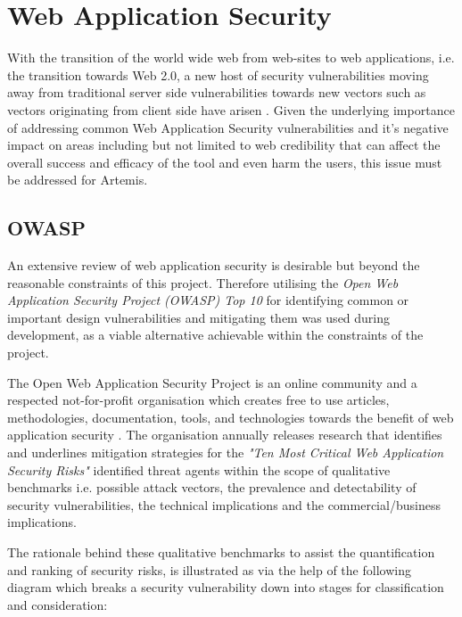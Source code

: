 \section{Web Application Security}

With the transition of the world wide web from web-sites to web applications, i.e. the transition towards Web 2.0, a new host of security vulnerabilities moving away from traditional server side vulnerabilities towards new vectors such as vectors originating from client side have arisen \cite{Dayfdd2011}. Given the underlying importance of addressing common Web Application Security vulnerabilities \cite{Dayfdd2011} and it's negative impact on areas including but not limited to web credibility \cite{Fogg2002a,Fogg1999} that can affect the overall success and efficacy of the tool and even harm the users, this issue must be addressed for Artemis.

\subsection{OWASP}

An extensive review of web application security is desirable but beyond the reasonable constraints of this project. Therefore  utilising the \textit{Open Web Application Security Project (OWASP) Top 10} \cite{OWASP2017} for identifying common or important design vulnerabilities and mitigating them was  used during development, as a viable alternative achievable within the constraints of the project.

The Open Web Application Security Project is an online community  and  a respected  not-for-profit organisation which creates free to use articles, methodologies, documentation, tools, and technologies towards the benefit of web application security \cite{OWASP}. The organisation  annually releases research that identifies and underlines mitigation strategies for the \textit{"Ten Most Critical Web Application Security Risks"}\cite{OWASP2017} identified threat agents within the scope of qualitative benchmarks i.e. possible attack vectors, the prevalence and detectability of security vulnerabilities, the technical implications and the commercial/business implications.

The rationale behind these qualitative benchmarks to assist the quantification and ranking of security risks,  is illustrated as via the help of the following diagram which breaks a security vulnerability down into stages for classification and consideration:

